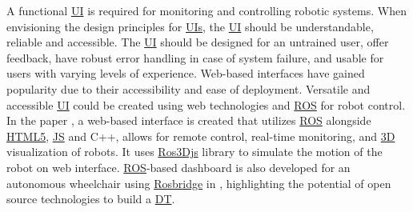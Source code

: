 A functional \hyperref[acro:UI]{UI} is required for monitoring and controlling robotic systems. When envisioning the design principles for \hyperref[acro:UI]{UIs}, the \hyperref[acro:UI]{UI} should be understandable, reliable and accessible. \cite{Wilkinson}
The \hyperref[acro:UI]{UI} should be designed for an untrained user, offer feedback, have robust error handling in case of system failure, and usable for users with varying levels of experience. Web-based interfaces have gained popularity due to their accessibility and ease of deployment.
Versatile and accessible \hyperref[acro:UI]{UI} could be created using web technologies and \hyperref[acro:ROS]{ROS} for robot control.
In the paper \cite{Xiao_2019}, a web-based interface is created that utilizes \hyperref[acro:ROS]{ROS} alongside \hyperref[acro:HTML5]{HTML5}, \hyperref[acro:JS]{JS} and C++, allows for remote control, real-time monitoring, and \hyperref[acro:3D]{3D} visualization of robots.
It uses \hyperref[acro:Ros3Djs]{Ros3Djs} library to simulate the motion of the robot on web interface. \hyperref[acro:ROS]{ROS}-based dashboard is also developed for an autonomous wheelchair using \hyperref[acro:Rosbridge]{Rosbridge} in \cite{10070046}, highlighting the potential of open source technologies to build a \hyperref[acro:DT]{DT}.


